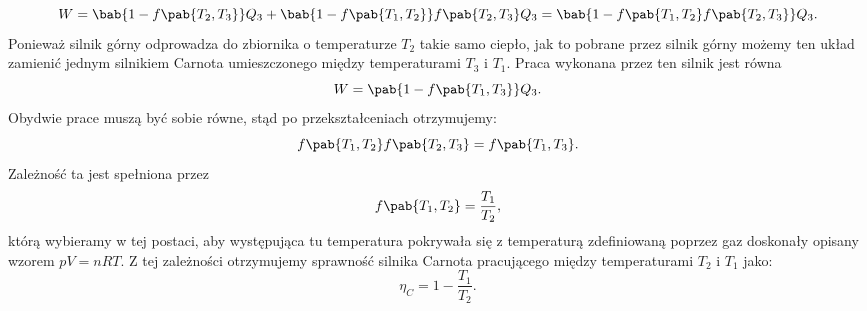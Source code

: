 \begin{equation}
W = \bab{1 - f\pab{T_2, T_3}}Q_3 + \bab{1 - f\pab{T_1, T_2}}f\pab{T_2, T_3}Q_3 = \bab{1 - f\pab{T_1, T_2}f\pab{T_2, T_3}}Q_3.
\end{equation}
Ponieważ silnik górny odprowadza do zbiornika o temperaturze $T_2$ takie samo ciepło, jak to pobrane przez silnik górny możemy ten układ zamienić jednym silnikiem Carnota umieszczonego między  temperaturami $T_3$ i $T_1$. Praca wykonana przez ten silnik jest równa
\begin{equation}
W = \pab{1 - f\pab{T_1, T_3}}Q_3.
\end{equation}
Obydwie prace muszą być sobie równe, stąd po przekształceniach otrzymujemy:
\begin{equation}
f\pab{T_1, T_2}f\pab{T_2, T_3} = f\pab{T_1, T_3}.
\end{equation}
Zależność ta jest spełniona przez
\begin{equation}
f\pab{T_1, T_2} = \frac{T_1}{T_2},
\end{equation}
którą wybieramy w tej postaci, aby występująca tu temperatura pokrywała się z temperaturą zdefiniowaną poprzez gaz doskonały opisany wzorem $pV = nRT$. Z tej zależności otrzymujemy sprawność silnika Carnota pracującego między temperaturami $T_2$ i $T_1$ jako:
\begin{equation}\label{eq:sprawnosc_carnot}
\eta_C = 1 - \frac{T_1}{T_2}.
\end{equation}
